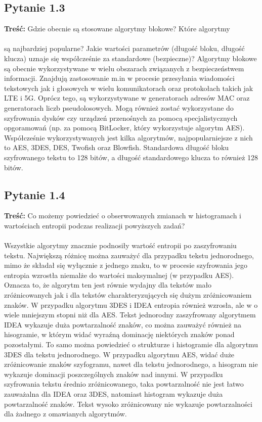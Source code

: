 \documentclass{article}
\begin{document}
\subsection{Pytanie 1.3}
    \textbf{Treść:} Gdzie obecnie są stosowane algorytmy blokowe? Które algorytmy \\\\
    są najbardziej popularne? Jakie wartości parametrów (długość bloku, długość klucza) uznaje
    się współcześnie za standardowe (bezpieczne)?
    Algorytmy blokowe są obecnie wykorzystywane w wielu obszarach związanych z bezpieczeństwem informacji. Znajdują zastosowanie m.in w procesie
    przesyłania wiadomości tekstowych jak i głosowych w wielu komunikatorach oraz protokołach takich jak LTE i 5G. Oprócz tego, są wykorzystywane w generatorach
    adresów MAC oraz generatorach liczb pseudolosowych. Mogą również zostać wykorzystane do szyfrowania dysków czy urządzeń przenośnych za pomocą
    specjalistycznych opgoramowań (np. za pomocą BitLocker, który wykorzystuje algorytm AES). Współcześnie wykorzystywanych jest kilka algorytmów,
    najpopularniejsze z nich to AES, 3DES, DES, Twofish oraz Blowfish. Standardowa długość bloku szyfrowanego tekstu to 128 bitów, a długość standardowego klucza to również 128 bitów.


\subsection{Pytanie 1.4}
    \textbf{Treść:} Co możemy powiedzieć o obserwowanych zmianach w histogramach i wartościach entropii
    podczas realizacji powyższych zadań?\\\\
    Wszystkie algorytmy znacznie podnosiły wartość entropii po zaszyfrowaniu tekstu. Największą różnicę można zauważyć
    dla przypadku tekstu jednorodnego, mimo że składał się wyłącznie z jednego znaku, to w procesie szyfrowania jego entropia wzrostła niemalże do wartości maksymalnej (w przypadku AES). 
    Oznacza to, że algorytm ten jest równie wydajny dla tekstów mało zróżnicowanych jak i dla tekstów charakteryzujących się dużym zróżnicowaniem znaków. 
    W przypadku algorytmu 3DES i IDEA entropia również wzrosła, ale w o wiele mniejszym stopni niż dla AES. Tekst jednorodny zaszyfrowany algorytmem IDEA
    wykazuje duża powtarzalność znaków, co można zauważyć również na hisogramie, w którym widać wyraźną dominację niektórych znaków ponad pozostałymi. To samo można powiedzieć 
    o strukturze i histogramie dla algorytmu 3DES dla tekstu jednorodnego. W przypadku algorytmu AES, widać duże zróżnicowanie znaków szyfogramu, nawet dla tekstu jednorodnego, a hisogram
    nie wykazuje dominacji poszczególnych znaków nad innymi. W przypadku szyfrowania tekstu średnio zróżnicowanego, taka powtarzalność nie jest łatwo zauważalna dla IDEA oraz 3DES, 
    natomiast histogram wykazuje duża powtarzalność znaków. Tekst wysoko zróżnicowany nie wykazuje powtarzalności dla żadnego z omawianych algorytmów.
\end{document}
